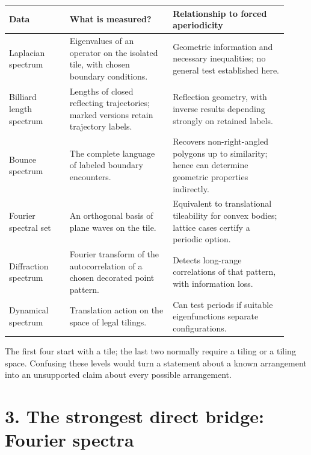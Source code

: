 \documentclass[11pt]{article}
\begin{document}
\begin{center}\small
\setlength{\tabcolsep}{4pt}
\begin{tabular}{>{\raggedright\arraybackslash}p{0.2\linewidth}>{\raggedright\arraybackslash}p{0.34\linewidth}>{\raggedright\arraybackslash}p{0.38\linewidth}}
\toprule
\textbf{Data} & \textbf{What is measured?} & \textbf{Relationship to forced aperiodicity} \\
\midrule
Laplacian spectrum & Eigenvalues of an operator on the isolated tile, with chosen boundary conditions. & Geometric information and necessary inequalities; no general test established here. \\

Billiard length spectrum & Lengths of closed reflecting trajectories; marked versions retain trajectory labels. & Reflection geometry, with inverse results depending strongly on retained labels. \\

Bounce spectrum & The complete language of labeled boundary encounters. & Recovers non-right-angled polygons up to similarity; hence can determine geometric properties indirectly. \\

Fourier spectral set & An orthogonal basis of plane waves on the tile. & Equivalent to translational tileability for convex bodies; lattice cases certify a periodic option. \\

Diffraction spectrum & Fourier transform of the autocorrelation of a chosen decorated point pattern. & Detects long-range correlations of that pattern, with information loss. \\

Dynamical spectrum & Translation action on the space of legal tilings. & Can test periods if suitable eigenfunctions separate configurations. \\

\bottomrule
\end{tabular}
\end{center}


The first four start with a tile; the last two normally require a tiling or a tiling space. Confusing these levels would turn a statement about a known arrangement into an unsupported claim about every possible arrangement.




\section*{3. The strongest direct bridge: Fourier spectra}
\end{document}
